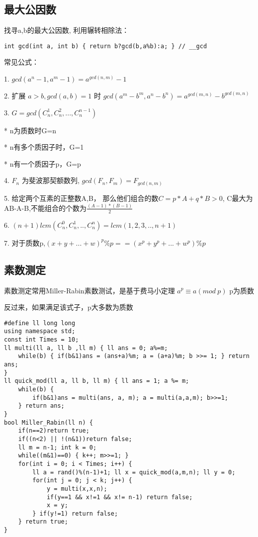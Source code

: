 \subsection{最大公因数}
找寻a,b的最大公因数, 利用辗转相除法：
\begin{lstlisting}
int gcd(int a, int b) { return b?gcd(b,a%b):a; } // __gcd
\end{lstlisting}
常见公式： 

1. $ gcd(a^n - 1, a^m - 1) = a^{gcd(n, m)} -1$ 

2. 扩展 $a>b, gcd(a, b)=1$ 时 $gcd(a^m-b^m, a^n- b^n) = a^{gcd(m, n)} - b^{gcd(m, n)}$ 

3. $G = gcd(C^1_n, C^2_n, ..., C^{n-1}_n)$ 

* n为质数时G=n 

* n有多个质因子时，G=1 

* n有一个质因子p，G=p 

4. $F_n$ 为斐波那契额数列, $gcd(F_n, F_m) = F_{gcd(n, m)}$

5. 给定两个互素的正整数A,B， 那么他们组合的数$C=p*A+q*B>0$, C最大为AB-A-B,不能组合的个数为$\frac{(A-1)*(B-1)}{2}$ 

6. $(n+1) lcm(C_n^0, C_n^1, .., C^n_n) = lcm(1, 2, 3, .. , n+1)$ 

7. 对于质数p,$(x+y+...+w)^p \%p  == (x^p + y^p + ... + w^p) \% p$ 


\subsection{素数测定}
素数测定常用Miller-Rabin素数测试，是基于费马小定理 $a^p \equiv a(mod \  p )$ p为质数

反过来，如果满足该式子，p大多数为质数

\begin{lstlisting}
#define ll long long
using namespace std;
const int Times = 10;
ll multi(ll a, ll b ,ll m) { ll ans = 0; a%=m;
    while(b) { if(b&1)ans = (ans+a)%m; a = (a+a)%m; b >>= 1; } return ans;
}
ll quick_mod(ll a, ll b, ll m) { ll ans = 1; a %= m;
    while(b) {
        if(b&1)ans = multi(ans, a, m); a = multi(a,a,m); b>>=1;
    } return ans;
}
bool Miller_Rabin(ll n) {
    if(n==2)return true;
    if((n<2) || !(n&1))return false;
    ll m = n-1; int k = 0;
    while((m&1)==0) { k++; m>>=1; }
    for(int i = 0; i < Times; i++) {
        ll a = rand()%(n-1)+1; ll x = quick_mod(a,m,n); ll y = 0;
        for(int j = 0; j < k; j++) {
            y = multi(x,x,n);
            if(y==1 && x!=1 && x!= n-1) return false;
            x = y;
        } if(y!=1) return false;
    } return true;
}
\end{lstlisting}

